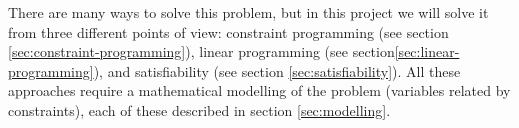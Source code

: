There are many ways to solve this problem, but in this project we will solve it from
three different points of view: constraint programming (see section \ref{sec:constraint-programming}),
linear programming (see section\ref{sec:linear-programming}), and satisfiability (see
section \ref{sec:satisfiability}). All these approaches require a mathematical modelling
of the problem (variables related by constraints), each of these described in section
\ref{sec:modelling}.
